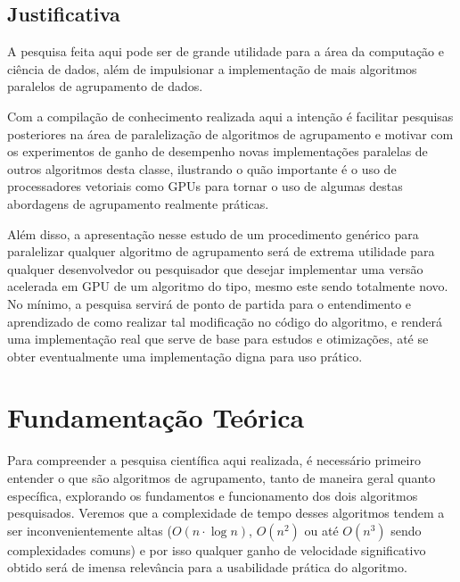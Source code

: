 \documentclass[12pt, %
openright, 
oneside, %
a4paper,    %
brazil]{facom-ufu-abntex2}
\def\qntAlgrtm{dois}
\begin{document}

\section{Justificativa}

A pesquisa feita aqui pode ser de grande utilidade para a área da computação e ciência de dados, além de impulsionar a implementação de mais algoritmos paralelos de agrupamento de dados.

Com a compilação de conhecimento realizada aqui a intenção é facilitar pesquisas posteriores na área de paralelização de algoritmos de agrupamento e motivar com os experimentos de ganho de desempenho novas implementações paralelas de outros algoritmos desta classe, ilustrando o quão importante é o uso de processadores vetoriais como GPUs para tornar o uso de algumas destas abordagens de agrupamento realmente práticas.

Além disso, a apresentação nesse estudo de um procedimento genérico para paralelizar qualquer algoritmo de agrupamento será de extrema utilidade para qualquer desenvolvedor ou pesquisador que desejar implementar uma versão acelerada em GPU de um algoritmo do tipo, mesmo este sendo totalmente novo. No mínimo, a pesquisa servirá de ponto de partida para o entendimento e aprendizado de como realizar tal modificação no código do algoritmo, e renderá uma implementação real que serve de base para estudos e otimizações, até se obter eventualmente uma implementação digna para uso prático.





\chapter{Fundamentação Teórica}

Para compreender a pesquisa científica aqui realizada, é necessário primeiro entender o que são algoritmos de agrupamento, tanto de maneira geral quanto específica, explorando os fundamentos e funcionamento dos \qntAlgrtm{} algoritmos pesquisados. Veremos que a complexidade de tempo desses algoritmos tendem a ser inconvenientemente altas ($O(n\cdot\log{n})$, $O(n^2)$ ou até $O(n^3)$ sendo complexidades comuns) e por isso qualquer ganho de velocidade significativo obtido será de imensa relevância para a usabilidade prática do algoritmo.
\end{document}
